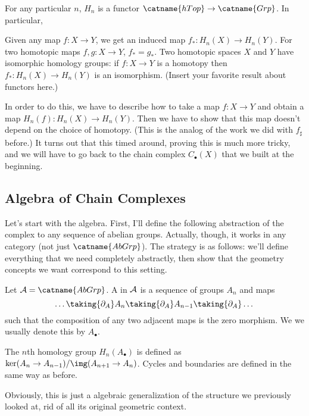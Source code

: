 \begin{theorem}
	\label{thm:Hn_functor}
	For any particular $n$, $H_n$ is a functor $\catname{hTop} \to \catname{Grp}$.
	In particular,
	\begin{itemize}
		\ii Given any map $f : X \to Y$, we get an induced map $f_\ast : H_n(X) \to H_n(Y)$.
		\ii For two homotopic maps $f, g : X \to Y$, $f_\ast = g_\ast$.
		\ii Two homotopic spaces $X$ and $Y$ have isomorphic homology groups:
		if $f : X \to Y$ is a homotopy then $f_\ast : H_n(X) \to H_n(Y)$ is an isomorphism.
		\ii (Insert your favorite result about functors here.)
	\end{itemize}
\end{theorem}

In order to do this, we have to describe how to take a map $f : X \to Y$
and obtain a map $H_n(f) : H_n(X) \to H_n(Y)$.
Then we have to show that this map doesn't depend on the choice of homotopy.
(This is the analog of the work we did with $f_\sharp$ before.)
It turns out that this timed around, proving this is much more tricky,
and we will have to go back to the chain complex $C_\bullet(X)$ that we built at the beginning.

\subsection*{Algebra of Chain Complexes}
Let's start with the algebra.
First, I'll define the following abstraction of the complex to any sequence of abelian groups.
Actually, though, it works in any category (not just $\catname{AbGrp}$).
The strategy is as follows: we'll define everything that we need completely abstractly,
then show that the geometry concepts we want correspond to this setting.

\begin{definition}
	Let $\AA = \catname{AbGrp}$.
	A  in $\AA$ is a sequence of groups $A_n$ and maps
	\[ \dots \taking{\partial_A} A_n \taking{\partial_A} A_{n-1} \taking{\partial_A} \dots \]
	such that the composition of any two adjacent maps is the zero morphism.
	We we usually denote this by $A_\bullet$.

	The $n$th homology group $H_n(A_\bullet)$ is defined
	as $\ker(A_n \to A_{n-1}) / \img(A_{n+1} \to A_n)$.
	Cycles and boundaries are defined in the same way as before.
\end{definition}
Obviously, this is just a algebraic generalization of the structure we previously looked at,
rid of all its original geometric context.

